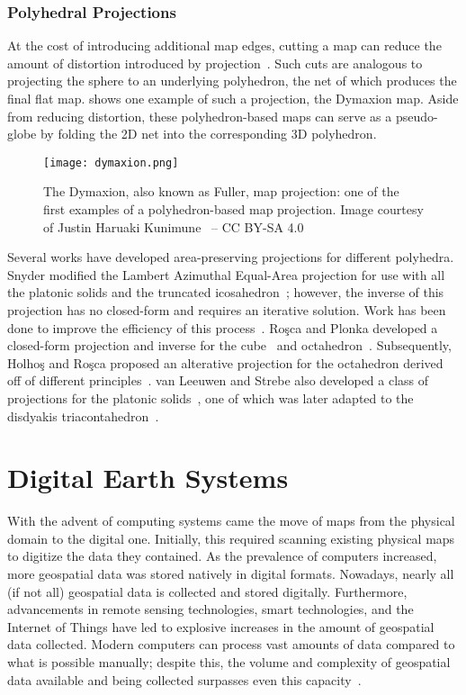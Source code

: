\subsubsection{Polyhedral Projections} \label{chap:2:polyProj}
At the cost of introducing additional map edges, cutting a map can reduce the amount of distortion introduced by projection~\cite{soliman2018optimal}.
Such cuts are analogous to projecting the sphere to an underlying polyhedron, the net of which produces the final flat map.
 shows one example of such a projection, the Dymaxion map.
Aside from reducing distortion, these polyhedron-based maps can serve as a pseudo-globe by folding the 2D net into the corresponding 3D polyhedron.


\begin{figure}[ht!]
	\centering
	\texttt{[image: dymaxion.png]}
	\caption[The Dymaxion (or Fuller) map projection]{
		The Dymaxion, also known as Fuller, map projection: one of the first examples of a polyhedron-based map projection.
		Image courtesy of Justin Haruaki Kunimune~\cite{dymaxion} -- CC BY-SA 4.0
	}
	\label{fig:poly-projection}
\end{figure}


Several works have developed area-preserving projections for different polyhedra.
Snyder modified the Lambert Azimuthal Equal-Area projection for use with all the platonic solids and the truncated icosahedron~\cite{snyder1992equal}; however, the inverse of this projection has no closed-form and requires an iterative solution.
Work has been done to improve the efficiency of this process~\cite{harrison2011optimization}.
Ro{\c{s}}ca and Plonka developed a closed-form projection and inverse for the cube~\cite{rocsca2011uniform} and octahedron~\cite{rocsca2012area}.
Subsequently, Holho{\c{s}} and Ro{\c{s}}ca proposed an alterative projection for the octahedron derived off of different principles~\cite{holhocs2014octahedral}.
van Leeuwen and Strebe also developed a class of projections for the platonic solids~\cite{van2006slice}, one of which was later adapted to the disdyakis triacontahedron~\cite{hall2020disdyakis}.


\section{Digital Earth Systems} \label{chap:2:DE}
With the advent of computing systems came the move of maps from the physical domain to the digital one.
Initially, this required scanning existing physical maps to digitize the data they contained.
As the prevalence of computers increased, more geospatial data was stored natively in digital formats.
Nowadays, nearly all (if not all) geospatial data is collected and stored digitally.
Furthermore, advancements in remote sensing technologies, smart technologies, and the Internet of Things have led to explosive increases in the amount of geospatial data collected.
Modern computers can process vast amounts of data compared to what is possible manually; despite this, the volume and complexity of geospatial data available and being collected surpasses even this capacity~\cite{lee2015geospatial}.


